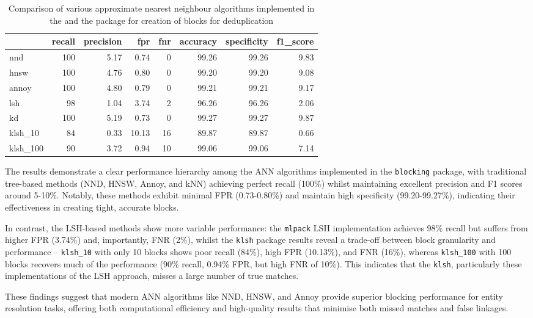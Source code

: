 \begin{table}

\caption{\label{tab:comparision}Comparison of various approximate nearest neighbour algorithms implemented in the  and the  package for creation of blocks for deduplication}
\centering
\begin{tabular}[t]{l|r|r|r|r|r|r|r}
\hline
  & recall & precision & fpr & fnr & accuracy & specificity & f1\_score\\
\hline
nnd & 100 & 5.17 & 0.74 & 0 & 99.26 & 99.26 & 9.83\\
\hline
hnsw & 100 & 4.76 & 0.80 & 0 & 99.20 & 99.20 & 9.08\\
\hline
annoy & 100 & 4.80 & 0.79 & 0 & 99.21 & 99.21 & 9.17\\
\hline
lsh & 98 & 1.04 & 3.74 & 2 & 96.26 & 96.26 & 2.06\\
\hline
kd & 100 & 5.19 & 0.73 & 0 & 99.27 & 99.27 & 9.87\\
\hline
klsh\_10 & 84 & 0.33 & 10.13 & 16 & 89.87 & 89.87 & 0.66\\
\hline
klsh\_100 & 90 & 3.72 & 0.94 & 10 & 99.06 & 99.06 & 7.14\\
\hline
\end{tabular}
\end{table}

The results demonstrate a clear performance hierarchy among the ANN
algorithms implemented in the \texttt{blocking} package, with traditional
tree-based methods (NND, HNSW, Annoy, and kNN) achieving perfect recall
(100\%) whilst maintaining excellent precision and F1 scores around 5-10\%.
Notably, these methods exhibit minimal FPR (0.73-0.80\%) and maintain
high specificity (99.20-99.27\%), indicating their effectiveness in
creating tight, accurate blocks.

In contrast, the LSH-based methods show more variable performance: the
\texttt{mlpack} LSH implementation achieves 98\% recall but suffers from higher
FPR (3.74\%) and, importantly, FNR (2\%), whilst the \texttt{klsh} package results
reveal a trade-off between block granularity and performance --
\texttt{klsh\_10} with only 10 blocks shows poor recall (84\%), high FPR (10.13\%),
and FNR (16\%), whereas \texttt{klsh\_100} with 100 blocks recovers much of the
performance (90\% recall, 0.94\% FPR, but high FNR of 10\%). This indicates that
the \texttt{klsh}, particularly these implementations of the LSH approach,
misses a large number of true matches.

These findings suggest that modern ANN algorithms like NND, HNSW, and
Annoy provide superior blocking performance for entity resolution tasks,
offering both computational efficiency and high-quality results that
minimise both missed matches and false linkages.

